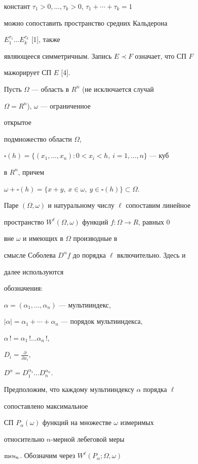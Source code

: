 констант $\tau_1>0,\dotsc,\tau_k>0$, $\tau_1+\dotsb+\tau_k=1$ 


можно сопоставить пространство средних Кальдерона 


$E^{\tau_1}_1\dotsc E^{\tau_k}_k$ [1], также 


являющееся симметричным. Запись $E\prec F$ означает, что СП $F$ 


мажорирует СП $E$ [4]. 


 


Пусть $\Omega$ --- область в $R^n$ (не исключается случай 


$\Omega=R^n$), $\omega$ --- ограниченное 


открытое 


подмножество области $\Omega$, 


$\square(h)=\{(x_1,\dotsc,x_n):0<x_i<h,\ i=1,\dotsc,n\}$ --- куб 


в $R^n$, причем 


$\omega+\square(h)=\{x+y,\ x\in\omega,\ y\in\square(h)\}\subset\Omega$. 


Паре $(\Omega,\omega)$ и натуральному числу $\ell$ сопоставим линейное 


пространство $W^\ell(\Omega,\omega)$ функций $f:\Omega\to R$, равных 0 


вне $\omega$ и имеющих в $\Omega$ производные в 


смысле Соболева $D^\alpha f$ до порядка $\ell$ включительно. Здесь и 


далее используются 


обозначения: 


$\alpha=(\alpha_1,\dotsc,\alpha_n)$ --- мультииндекс, 


$|\alpha|=\alpha_1+\dotsb+\alpha_n$ --- порядок мультииндекса, 


$\alpha\,!=\alpha_1\,!\dotsc\alpha_n\,!$, 


$D_i=\frac{\partial}{\partial x_i}$, 


$D^\alpha=D^{\alpha_1}_1\dotsc D^{\alpha_n}_n$. 


 


Предположим, что каждому мультииндексу $\alpha$ порядка $\ell$ 


сопоставлено максимальное 


СП $P_\alpha(\omega)$ функций на множестве $\omega$ измеримых 


относительно $n$-мерной лебеговой меры 


$\operatorname{mes}_n$. Обозначим через $W^\ell(P_\alpha;\Omega,\omega)$ 


